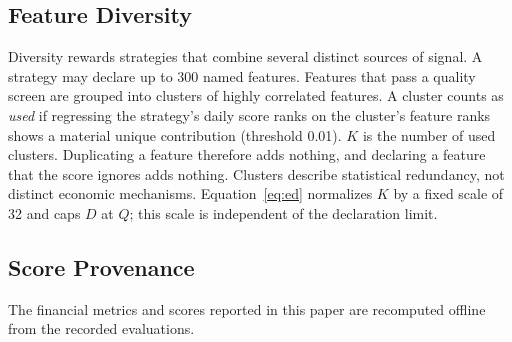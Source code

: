\subsection{Feature Diversity}
\label{app:diversity}

Diversity rewards strategies that combine several distinct sources of signal. A strategy may declare up to 300 named features. Features that pass a quality screen are grouped into clusters of highly correlated features. A cluster counts as \emph{used} if regressing the strategy's daily score ranks on the cluster's feature ranks shows a material unique contribution (threshold 0.01). $K$ is the number of used clusters. Duplicating a feature therefore adds nothing, and declaring a feature that the score ignores adds nothing. Clusters describe statistical redundancy, not distinct economic mechanisms. Equation~\eqref{eq:ed} normalizes $K$ by a fixed scale of 32 and caps $D$ at $Q$; this scale is independent of the declaration limit.

\subsection{Score Provenance}

The financial metrics and scores reported in this paper are recomputed offline from the recorded evaluations.
